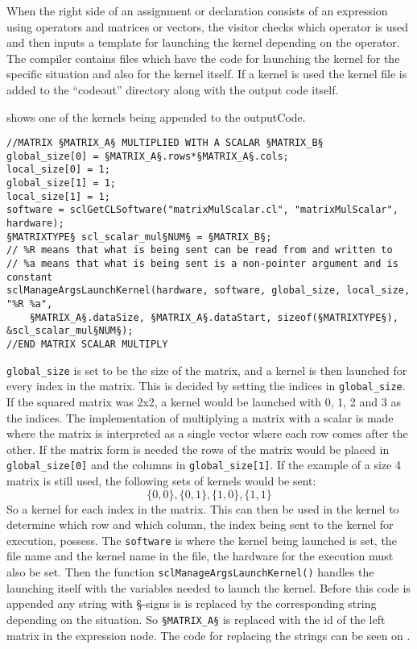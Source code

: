 When the right side of an assignment or declaration consists of an expression using operators and matrices or vectors, the visitor checks which operator is used and then inputs a template for launching the kernel depending on the operator.
The compiler contains files which have the code for launching the kernel for the specific situation and also for the kernel itself.
If a kernel is used the kernel file is added to the ``codeout'' directory along with the output code itself.

 shows one of the kernels being appended to the outputCode.

\begin{lstlisting}[caption=Simple\gls{opencl} launch of a kernel calculating a matrix or vector multiplied with a scalar.,numbers=none,frame=tlrb,label={lst:kernelLaunch}]
//MATRIX §MATRIX_A§ MULTIPLIED WITH A SCALAR §MATRIX_B§
global_size[0] = §MATRIX_A§.rows*§MATRIX_A§.cols;
local_size[0] = 1;
global_size[1] = 1;
local_size[1] = 1;
software = sclGetCLSoftware("matrixMulScalar.cl", "matrixMulScalar", hardware);
§MATRIXTYPE§ scl_scalar_mul§NUM§ = §MATRIX_B§;
// %R means that what is being sent can be read from and written to
// %a means that what is being sent is a non-pointer argument and is constant
sclManageArgsLaunchKernel(hardware, software, global_size, local_size, "%R %a",
    §MATRIX_A§.dataSize, §MATRIX_A§.dataStart, sizeof(§MATRIXTYPE§), &scl_scalar_mul§NUM§);
//END MATRIX SCALAR MULTIPLY
\end{lstlisting}

\texttt{global\_size} is set to be the size of the matrix, and a kernel is then launched for every index in the matrix.
This is decided by setting the indices in \texttt{global\_size}.
If the squared matrix was 2x2, a kernel would be launched with 0, 1, 2 and 3 as the indices.
The implementation of multiplying a matrix with a scalar is made where the matrix is interpreted as a single vector where each row comes after the other.
If the matrix form is needed the rows of the matrix would be placed in \texttt{global\_size[0]} and the columns in \texttt{global\_size[1]}.
If the example of a size 4 matrix is still used, the following sets of kernels would be sent:
\begin{equation}
\{0,0\}, \{0,1\}, \{1,0\}, \{1,1\}
\end{equation}
So a kernel for each index in the matrix.
This can then be used in the kernel to determine which row and which column, the index being sent to the kernel for execution, possess.
The \texttt{software} is where the kernel being launched is set, the file name and the kernel name in the file, the hardware for the execution must also be set.
Then the function \texttt{sclManageArgsLaunchKernel()} handles the launching itself with the variables needed to launch the kernel.
Before this code is appended any string with  \S-signs is is replaced by the corresponding string depending on the situation.
So \texttt{§MATRIX\_A§} is replaced with the id of the left matrix in the expression node.
The code for replacing the strings can be seen on .

